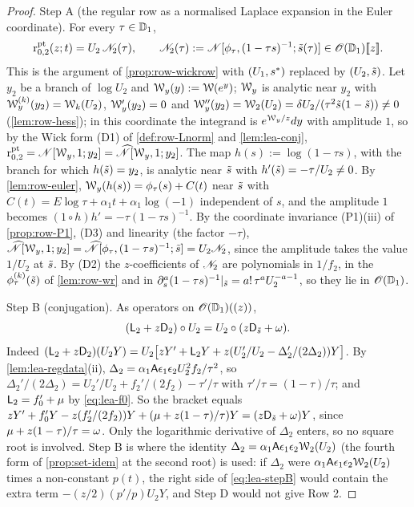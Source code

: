 \begin{proof}
Step A (the regular row as a normalised Laplace expansion in the Euler coordinate). For every $\tau\in\mathbb{D}_{1}$,
\begin{equation}
\label{eq:lea-stepA}
\mathrm{r}^{\mathrm{pt}}_{0,2}(z;t) = U_2\,\mathscr{N}_{2}(\tau),\qquad \mathscr{N}_{2}(\tau) := \mathscr{N}[\phi_\tau,(1-\tau s)^{-1};\tilde{s}(\tau)]\in\mathscr{O}(\mathbb{D}_{1})[\![ z ]\!].
\end{equation}
This is the argument of \cref{prop:row-wickrow} with $(U_1,s^{\ast})$ replaced by $(U_2,\tilde{s})$. Let $y_2$ be a branch of $\log U_2$ and $\mathcal{W}_y(y) := \mathcal{W}(e^y)$; $\mathcal{W}_y$ is analytic near $y_2$ with $\mathcal{W}_y^{(k)}(y_2) = \mathcal{W}_k(U_2)$, $\mathcal{W}_y'(y_2) = 0$ and $\mathcal{W}_y''(y_2) = \mathcal{W}_2(U_2) = \delta U_2/(\tau^2\tilde{s}(1-\tilde{s}))\neq 0$ (\cref{lem:row-hess}); in this coordinate the integrand is $e^{\mathcal{W}_y/z}dy$ with amplitude $1$, so by the Wick form (D1) of \cref{def:row-Lnorm} and \cref{lem:lea-conj}, $\mathrm{r}^{\mathrm{pt}}_{0,2} = \mathscr{N}[\mathcal{W}_y,1;y_2] = \widehat{\mathscr{N}}[\mathcal{W}_y,1;y_2]$. The map $h(s) := \log(1-\tau s)$, with the branch for which $h(\tilde{s}) = y_2$, is analytic near $\tilde{s}$ with $h'(\tilde{s}) = -\tau/U_2\neq 0$. By \cref{lem:row-euler}, $\mathcal{W}_y(h(s)) = \phi_\tau(s) + C(t)$ near $\tilde{s}$ with $C(t) = E\log\tau + \alpha_1t + \alpha_1\log(-1)$ independent of $s$, and the amplitude $1$ becomes $(1\circ h)h' = -\tau(1-\tau s)^{-1}$. By the coordinate invariance (P1)(iii) of \cref{prop:row-P1}, (D3) and linearity (the factor $-\tau$), $\widehat{\mathscr{N}}[\mathcal{W}_y,1;y_2] = \widehat{\mathscr{N}}[\phi_\tau,(1-\tau s)^{-1};\tilde{s}] = U_2\mathscr{N}_{2}$, since the amplitude takes the value $1/U_2$ at $\tilde{s}$. By (D2) the $z$-coefficients of $\mathscr{N}_{2}$ are polynomials in $1/f_2$, in the $\phi_\tau^{(k)}(\tilde{s})$ of \cref{lem:row-wr} and in $\partial_s^a(1-\tau s)^{-1}|_{\tilde{s}} = a!\,\tau^aU_2^{-a-1}$, so they lie in $\mathscr{O}(\mathbb{D}_{1})$.

Step B (conjugation). As operators on $\mathscr{O}(\mathbb{D}_{1})((z))$,
\begin{equation}
\label{eq:lea-stepB}
(\mathsf{L}_2 + z\mathsf{D}_2)\circ U_2 = U_2\circ(z\mathsf{D}_{\tilde{s}} + \omega).
\end{equation}
Indeed $(\mathsf{L}_2+z\mathsf{D}_2)(U_2Y) = U_2\bigl[zY' + \mathsf{L}_2Y + z(U_2'/U_2 - \Delta_2'/(2\Delta_2))Y\bigr]$. By \cref{lem:lea-regdata}(ii), $\Delta_2 = \alpha_1\mathsf{A}\epsilon_1\epsilon_2U_2^2f_2/\tau^2$, so $\Delta_2'/(2\Delta_2) = U_2'/U_2 + f_2'/(2f_2) - \tau'/\tau$ with $\tau'/\tau = (1-\tau)/\tau$; and $\mathsf{L}_2 = f_0' + \mu$ by \eqref{eq:lea-f0}. So the bracket equals $zY' + f_0'Y - z(f_2'/(2f_2))Y + (\mu + z(1-\tau)/\tau)Y = (z\mathsf{D}_{\tilde{s}}+\omega)Y$, since $\mu + z(1-\tau)/\tau = \omega$. Only the logarithmic derivative of $\Delta_2$ enters, so no square root is involved. Step B is where the identity $\Delta_2 = \alpha_1\mathsf{A}\epsilon_1\epsilon_2\mathcal{W}_2(U_2)$ (the fourth form of \cref{prop:set-idem} at the second root) is used: if $\Delta_2$ were $\alpha_1\mathsf{A}\epsilon_1\epsilon_2\mathcal{W}_2(U_2)$ times a non-constant $p(t)$, the right side of \eqref{eq:lea-stepB} would contain the extra term $-(z/2)(p'/p)U_2Y$, and Step D would not give Row 2.


\end{proof}
